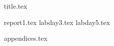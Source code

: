 \documentclass[final]{scrartcl} %
\begin{document}

{title.tex}

\newpage

\tableofcontents

\newpage
{}
{report1.tex}
\newpage
{labday3.tex}
\newpage
{labday5.tex}
\newpage
{}

\printbibliography
{appendices.tex}
\end{document}

